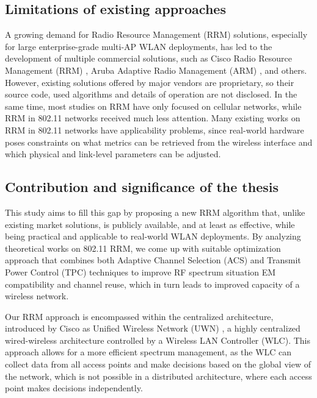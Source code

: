\subsection{Limitations of existing approaches}
A growing demand for Radio Resource Management (RRM) solutions, especially for large enterprise-grade multi-AP WLAN deployments, has led to the development of multiple commercial solutions, such as Cisco Radio Resource Management (RRM) \cite{ciscoRadioResourceManagement}, Aruba Adaptive Radio Management (ARM) \cite{UnderstandingARM}, and others. However, existing solutions offered by major vendors are proprietary, so their source code, used algorithms and details of operation are not disclosed.
In the same time, most studies on RRM have only focused on cellular networks, while RRM in 802.11 networks received much less attention. Many existing works on RRM in 802.11 networks have applicability problems, since real-world hardware poses constraints on what metrics can be retrieved from the wireless interface and which physical and link-level parameters can be adjusted.
\subsection{Contribution and significance of the thesis}
This study aims to fill this gap by proposing a new RRM algorithm that, unlike existing market solutions, is publicly available, and at least as effective, while being practical and applicable to real-world WLAN deployments.
By analyzing theoretical works on 802.11 RRM, we come up with suitable optimization approach that combines both Adaptive Channel Selection (ACS) and Transmit Power Control (TPC) techniques to improve RF spectrum situation EM compatibility and channel reuse, which in turn leads to improved capacity of a wireless network.

Our RRM approach is encompassed within the centralized architecture, introduced by Cisco as Unified Wireless Network (UWN) \cite{CiscoUnifiedWirelessa}, a highly centralized wired-wireless architecture controlled by a Wireless LAN Controller (WLC). This approach allows for a more efficient spectrum management, as the WLC can collect data from all access points and make decisions based on the global view of the network, which is not possible in a distributed architecture, where each access point makes decisions independently.



